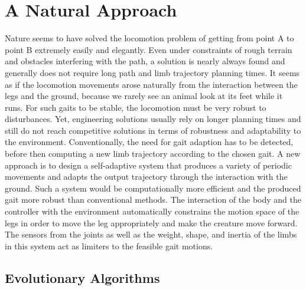 \documentclass[main]{subfiles}
\begin{document}
\section{A Natural Approach}

Nature seems to have solved the locomotion problem of getting from point A to point B extremely easily and elegantly. %
%
Even under constraints of rough terrain and obstacles interfering with the path, a solution is nearly always found and generally does not require long path and limb trajectory planning times. %
%
It seems as if the locomotion movements arose naturally from the interaction between the legs and the ground, because we rarely see an animal look at its feet while it runs. %
%
For such gaits to be stable, the locomotion must be very robust to disturbances. %
%
Yet, engineering solutions usually rely on longer planning times and still do not reach competitive solutions in terms of robustness and adaptability to the environment. %
%
Conventionally, the need for gait adaption has to be detected, before then computing a new limb trajectory according to the chosen gait. %
%
A new approach is to design a self-adaptive system that produces a variety of periodic movements and adapts the output trajectory through the interaction with the ground. %
%
Such a system would be computationally more efficient and the produced gait more robust than conventional methods. %
%
The interaction of the body and the controller with the environment automatically constrains the motion space of the legs in order to move the leg appropriately and make the creature move forward. %
%
The sensors from the joints as well as the weight, shape, and inertia of the limbs in this system act as limiters to the feasible gait motions.

\subsection{Evolutionary Algorithms}
\end{document}
